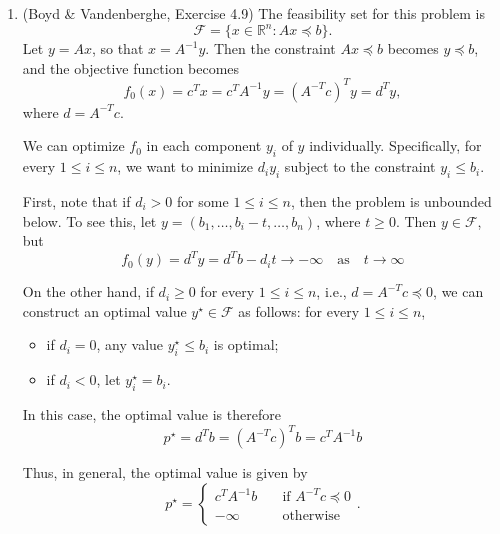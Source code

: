 \documentclass[letterpaper,12pt]{article}
\begin{document}
\begin{enumerate}
\begin{enumerate}
\end{enumerate}

\item (Boyd \& Vandenberghe, Exercise 4.9) The feasibility set for
  this problem is
  \begin{equation*}
    \mathcal{F} = \{x \in \mathbb{R}^n : Ax \preceq b\}.
  \end{equation*}
  Let $y = Ax$, so that $x = A^{-1}y$. Then the constraint
  $Ax \preceq b$ becomes $y \preceq b$, and the objective function
  becomes
  \begin{equation*}
    f_0(x) = c^T x = c^T A^{-1} y = (A^{-T} c)^T y = d^T y,
  \end{equation*}
  where $d = A^{-T} c$.

  We can optimize $f_0$ in each component $y_i$ of $y$
  individually. Specifically, for every $1 \leq i \leq n$, we want to
  minimize $d_i y_i$ subject to the constraint $y_i \leq b_i$.

  First, note that if $d_i > 0$ for some $1 \leq i \leq n$, then the
  problem is unbounded below. To see this, let
  $y = (b_1, \ldots, b_i - t, \ldots, b_n)$, where $t \geq 0$. Then
  $y \in \mathcal{F}$, but
  \begin{equation*}
    f_0(y) = d^T y = d^T b - d_i t \to -\infty
      \quad \text{as} \quad t \to \infty
  \end{equation*}

  On the other hand, if $d_i \geq 0$ for every $1 \leq i \leq n$,
  i.e., $d = A^{-T} c \preceq 0$, we can construct an optimal value
  $y^\star \in \mathcal{F}$ as follows: for every $1 \leq i \leq n$,
  \begin{itemize}
  \item if $d_i = 0$, any value $y^\star_i \leq b_i$ is optimal;
  \item if $d_i < 0$, let $y^\star_i = b_i$.
  \end{itemize}
  In this case, the optimal value is therefore
  \begin{equation*}
    p^\star = d^T b = (A^{-T} c)^T b = c^T A^{-1} b
  \end{equation*}

  Thus, in general, the optimal value is given by
  \begin{equation*}
    p^\star = \begin{cases}
      c^T A^{-1} b &\quad \text{if $A^{-T} c \preceq 0$} \\
      -\infty &\quad \text{otherwise}
    \end{cases}.
  \end{equation*}


\end{enumerate}
\end{document}
